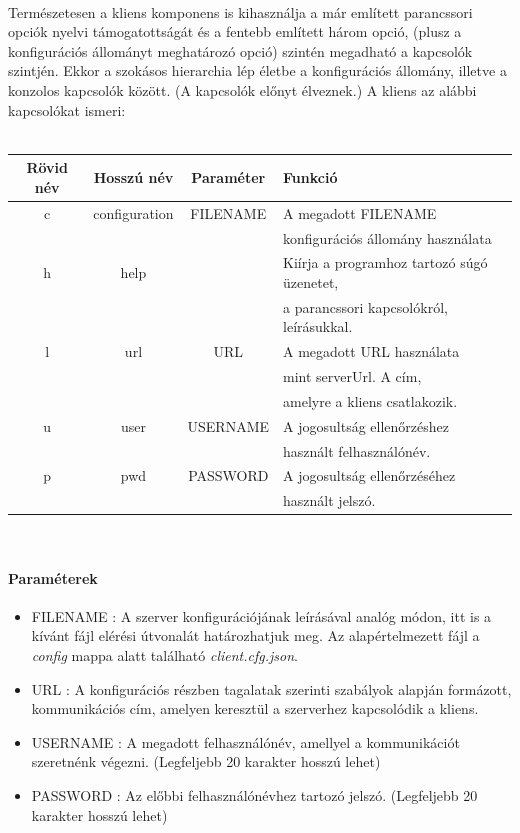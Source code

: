 \documentclass[12pt]{report}
\begin{document}
\paragraph{}
Természetesen a kliens komponens is kihasználja a már említett parancssori opciók nyelvi támogatottságát és a fentebb említett három opció, (plusz a konfigurációs állományt meghatározó opció) szintén megadható a kapcsolók szintjén.
Ekkor a szokásos hierarchia lép életbe a konfigurációs állomány, illetve a konzolos kapcsolók között. (A kapcsolók előnyt élveznek.)
A kliens az alábbi kapcsolókat ismeri: \\ \\
 \begin{tabular}{ c | c | c | l }
 \label{tab:cli}
 \centering
  \textbf{Rövid név} & \textbf{Hosszú név} & \textbf{Paraméter} & \textbf{Funkció} \\ \hline
  c & configuration & FILENAME & A megadott FILENAME \\
  &&& konfigurációs állomány használata \\ \hline
  h & help & & Kiírja a programhoz tartozó súgó üzenetet, \\
  &&& a parancssori kapcsolókról, leírásukkal. \\ \hline
  l & url & URL & A megadott URL használata \\
  &&& mint serverUrl. A cím, \\
  &&& amelyre a kliens csatlakozik. \\ \hline
  u & user & USERNAME & A jogosultság ellenőrzéshez \\
  &&& használt felhasználónév. \\ \hline
  p & pwd & PASSWORD & A jogosultság ellenőrzéséhez \\
  &&& használt jelszó.\\ \hline
  \end{tabular}
\\
  \paragraph{Paraméterek}
  \begin{itemize}
  \item FILENAME : A szerver konfigurációjának leírásával analóg módon, itt is a kívánt fájl elérési útvonalát határozhatjuk meg. Az alapértelmezett fájl a \textit{config} mappa alatt található \textit{client.cfg.json}.
  \item URL : A konfigurációs részben tagalatak szerinti szabályok alapján formázott, kommunikációs cím, amelyen keresztül a szerverhez kapcsolódik a kliens.
  \item USERNAME : A megadott felhasználónév, amellyel a kommunikációt szeretnénk végezni. (Legfeljebb 20 karakter hosszú lehet)
  \item PASSWORD : Az előbbi felhasználónévhez tartozó jelszó. (Legfeljebb 20 karakter hosszú lehet)
  \end{itemize}
\end{document}
